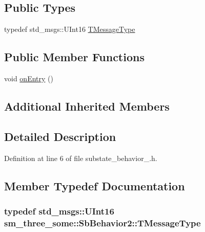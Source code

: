 \subsection*{Public Types}
\begin{DoxyCompactItemize}
\item 
typedef std\+\_\+msgs\+::\+U\+Int16 \hyperlink{classsm__three__some_1_1SbBehavior2_a21a70b8158d3e0f09204159b3007f8bd}{T\+Message\+Type}
\end{DoxyCompactItemize}
\subsection*{Public Member Functions}
\begin{DoxyCompactItemize}
\item 
void \hyperlink{classsm__three__some_1_1SbBehavior2_a230f9afb6797a70d44b02bd79d2ba8f6}{on\+Entry} ()
\end{DoxyCompactItemize}
\subsection*{Additional Inherited Members}


\subsection{Detailed Description}


Definition at line 6 of file substate\+\_\+behavior\+\_.\+h.



\subsection{Member Typedef Documentation}
\subsubsection[{\texorpdfstring{T\+Message\+Type}{TMessageType}}]{\setlength{\rightskip}{0pt plus 5cm}typedef std\+\_\+msgs\+::\+U\+Int16 {\bf sm\+\_\+three\+\_\+some\+::\+Sb\+Behavior2\+::\+T\+Message\+Type}}\hypertarget{classsm__three__some_1_1SbBehavior2_a21a70b8158d3e0f09204159b3007f8bd}{}\label{classsm__three__some_1_1SbBehavior2_a21a70b8158d3e0f09204159b3007f8bd}


